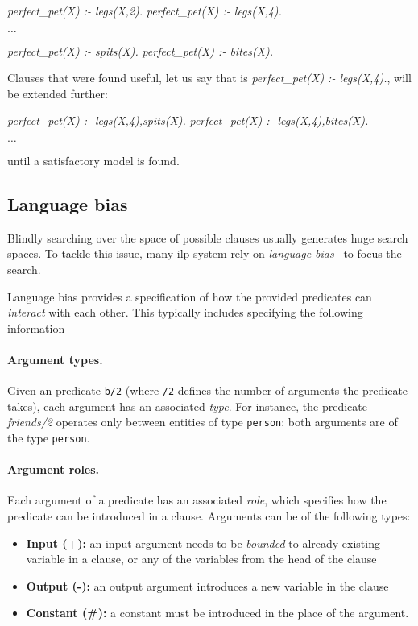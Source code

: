\begin{center}
	\textit{perfect\_pet(X) :- legs(X,2).} \quad \textit{perfect\_pet(X) :- legs(X,4).}

	$\ldots$

	\textit{perfect\_pet(X) :- spits(X).} \quad \textit{perfect\_pet(X) :- bites(X).}
\end{center}


Clauses that were found useful, let us say that is \textit{perfect\_pet(X) :- legs(X,4).}, will be extended further:


\begin{center}
	\textit{perfect\_pet(X) :- legs(X,4),spits(X).} \quad \textit{perfect\_pet(X) :- legs(X,4),bites(X).}

	$\ldots$
\end{center}

until a satisfactory model is found.







\subsection{Language bias}
\label{ch2:languagebias}

Blindly searching over the space of possible clauses usually generates huge search spaces.
To tackle this issue, many \gls{ilp} system rely on \textit{language bias}~\cite{DBLP:reference/ml/Blockeel17} to focus the search.


Language bias provides a specification of how the provided predicates can \textit{interact} with each other.
This typically includes specifying the following information


\paragraph{Argument types.} Given an predicate \texttt{b/2} (where \texttt{/2} defines the number of arguments the predicate takes), each argument has an associated \textit{type}. For instance, the predicate \textit{friends/2} operates only between entities of type \texttt{person}: both arguments are of the type \texttt{person}.


\paragraph{Argument roles.} Each argument of a predicate has an associated \textit{role}, which specifies how the predicate can be introduced in a clause.
Arguments can be of the following types:
\begin{itemize}
	\item \textbf{Input (+):} an input argument needs to be \textit{bounded} to already existing variable in a clause, or any of the variables from the head of the clause
	\item \textbf{Output (-):} an output argument introduces a new variable in the clause
	\item \textbf{Constant (\#):} a constant must be introduced in the place of the argument.
\end{itemize}

